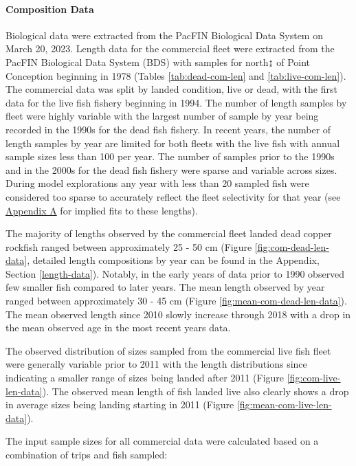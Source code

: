 \documentclass[11pt,
  english,
  letterpaper,
]{article}
\begin{document}
\hypertarget{composition-data}{%
\paragraph{Composition Data}\label{composition-data}}

\hfill\break

Biological data were extracted from the PacFIN Biological Data System on March 20, 2023. Length data for the commercial fleet were extracted from the PacFIN Biological Data System (BDS) with samples for north↨ of Point Conception beginning in 1978 (Tables \ref{tab:dead-com-len} and \ref{tab:live-com-len}). The commercial data was split by landed condition, live or dead, with the first data for the live fish fishery beginning in 1994. The number of length samples by fleet were highly variable with the largest number of sample by year being recorded in the 1990s for the dead fish fishery. In recent years, the number of length samples by year are limited for both fleets with the live fish with annual sample sizes less than 100 per year. The number of samples prior to the 1990s and in the 2000s for the dead fish fishery were sparse and variable across sizes. During model explorations any year with less than 20 sampled fish were considered too sparse to accurately reflect the fleet selectivity for that year (see \protect\hyperlink{excluded-data}{Appendix A} for implied fits to these lengths).

The majority of lengths observed by the commercial fleet landed dead copper rockfish ranged between approximately 25 - 50 cm (Figure \ref{fig:com-dead-len-data}, detailed length compositions by year can be found in the Appendix, Section \ref{length-data}). Notably, in the early years of data prior to 1990 observed few smaller fish compared to later years. The mean length observed by year ranged between approximately 30 - 45 cm (Figure \ref{fig:mean-com-dead-len-data}). The mean observed length since 2010 slowly increase through 2018 with a drop in the mean observed age in the most recent years data.

The observed distribution of sizes sampled from the commercial live fish fleet were generally variable prior to 2011 with the length distributions since indicating a smaller range of sizes being landed after 2011 (Figure \ref{fig:com-live-len-data}). The observed mean length of fish landed live also clearly shows a drop in average sizes being landing starting in 2011 (Figure \ref{fig:mean-com-live-len-data}).

The input sample sizes for all commercial data were calculated based on a combination of trips and fish sampled:
\end{document}
